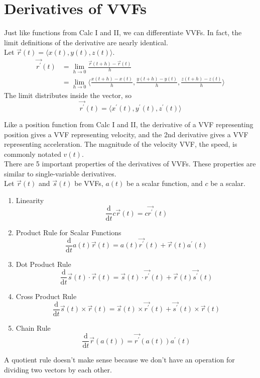 \section{Derivatives of VVFs}
\noindent
Just like functions from Calc I and II, we can differentiate VVFs. In fact, the limit definitions of the derivative are nearly identical.\\
Let $\vec{r}(t) = \langle x(t), y(t), z(t) \rangle$.
\begin{align*}
	\vec{r^\prime}(t) &= \lim_{h\to 0}{\frac{\vec{r}(t+h)-\vec{r}(t)}{h}} \\
	&= \lim_{h\to 0}{\langle \frac{x(t+h)-x(t)}{h}, \frac{y(t+h)-y(t)}{h}, \frac{z(t+h)-z(t)}{h} \rangle}
\end{align*}
The limit distributes inside the vector, so
\begin{equation*}
	\vec{r^\prime}(t) = \langle x^{\prime}(t), y^{\prime}(t), z^{\prime}(t) \rangle
\end{equation*}

\noindent
Like a position function from Calc I and II, the derivative of a VVF representing position gives a VVF representing velocity, and the 2nd derivative gives a VVF representing acceleration. The magnitude of the velocity VVF, the speed, is commonly notated $v(t)$.\\

\noindent
There are 5 important properties of the derivatives of VVFs. These properties are similar to single-variable derivatives.\\
Let $\vec{r}(t)$ and $\vec{s}(t)$ be VVFs, $a(t)$ be a scalar function, and $c$ be a scalar.\\
\begin{enumerate}
	\item Linearity
	\begin{equation*}
		\frac{\mathrm{d}}{\mathrm{d}t}c\vec{r}(t) = c\vec{r^\prime}(t)	
	\end{equation*}
	\item Product Rule for Scalar Functions
	\begin{equation*}
		\frac{\mathrm{d}}{\mathrm{d}t}a(t)\vec{r}(t) = a(t)\vec{r^\prime}(t) + \vec{r}(t)a^{\prime}(t)
	\end{equation*}
	\item Dot Product Rule
	\begin{equation*}
		\frac{\mathrm{d}}{\mathrm{d}t}\vec{s}(t)\cdot\vec{r}(t) = \vec{s}(t)\cdot\vec{r^\prime}(t) + \vec{r}(t)\vec{s^\prime}(t)	
	\end{equation*}
	\item Cross Product Rule
	\begin{equation*}
		\frac{\mathrm{d}}{\mathrm{d}t}\vec{s}(t)\times\vec{r}(t) = \vec{s}(t)\times\vec{r^\prime}(t) + \vec{s^\prime}(t)\times\vec{r}(t)	
	\end{equation*}
	\item Chain Rule
	\begin{equation*}
		\frac{\mathrm{d}}{\mathrm{d}t}\vec{r}(a(t)) = \vec{r^\prime}(a(t))a^{\prime}(t)
	\end{equation*}
\end{enumerate}
A quotient rule doesn't make sense because we don't have an operation for dividing two vectors by each other.

